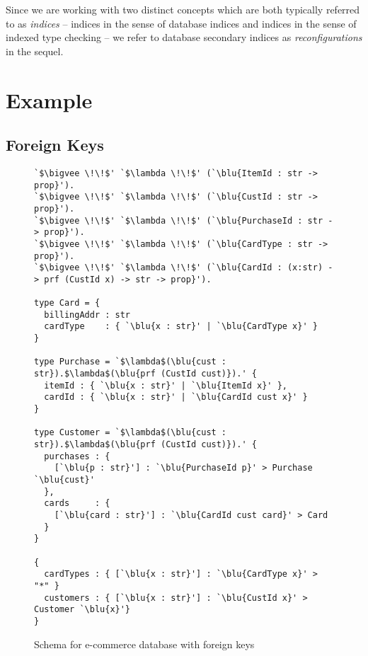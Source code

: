 \documentclass[sigplan,10pt,review,anonymous]{acmart}
\newcommand{\blu}[1]{\textbf{\color{blue}{#1}}}
\begin{document}
Since we are working with two distinct concepts which are both typically referred to as \emph{indices} -- indices in the sense of database indices and indices in the sense of indexed type checking -- we refer to database secondary indices as \emph{reconfigurations} in the sequel.





\section{Example}




\subsection{Foreign Keys}

\begin{figure}

\begin{lstlisting}[escapeinside=`']
`$\bigvee \!\!$' `$\lambda \!\!$' (`\blu{ItemId : str -> prop}').
`$\bigvee \!\!$' `$\lambda \!\!$' (`\blu{CustId : str -> prop}').
`$\bigvee \!\!$' `$\lambda \!\!$' (`\blu{PurchaseId : str -> prop}').
`$\bigvee \!\!$' `$\lambda \!\!$' (`\blu{CardType : str -> prop}').
`$\bigvee \!\!$' `$\lambda \!\!$' (`\blu{CardId : (x:str) -> prf (CustId x) -> str -> prop}').

type Card = {
  billingAddr : str
  cardType    : { `\blu{x : str}' | `\blu{CardType x}' }
}

type Purchase = `$\lambda$(\blu{cust : str}).$\lambda$(\blu{prf (CustId cust)}).' {
  itemId : { `\blu{x : str}' | `\blu{ItemId x}' }, 
  cardId : { `\blu{x : str}' | `\blu{CardId cust x}' }
}

type Customer = `$\lambda$(\blu{cust : str}).$\lambda$(\blu{prf (CustId cust)}).' { 
  purchases : { 
    [`\blu{p : str}'] : `\blu{PurchaseId p}' > Purchase `\blu{cust}' 
  },
  cards     : { 
    [`\blu{card : str}'] : `\blu{CardId cust card}' > Card 
  }
}

{
  cardTypes : { [`\blu{x : str}'] : `\blu{CardType x}' > "*" }
  customers : { [`\blu{x : str}'] : `\blu{CustId x}' > Customer `\blu{x}'}
}
\end{lstlisting}

\caption{Schema for e-commerce database with foreign keys}
\label{fig:ecommerce}
\end{figure}
\end{document}
